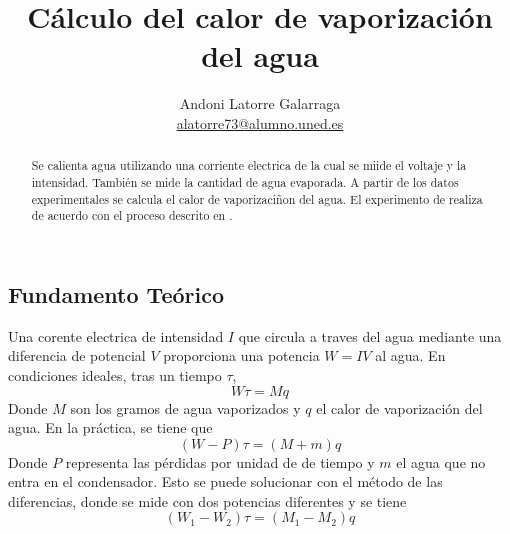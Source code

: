 \documentclass{article}
\title{Cálculo del calor de vaporización del agua}
\author{Andoni Latorre Galarraga \\ \href{mailto:alatorre73@alumno.uned.es}{alatorre73@alumno.uned.es}}
\date{}
\begin{document}
\maketitle
\begin{abstract}
Se calienta agua utilizando una corriente electrica de la cual se miide el voltaje y la intensidad. También se mide la cantidad de agua evaporada. A partir de los datos experimentales se calcula el calor de vaporizaciñon del agua. El experimento de realiza de acuerdo con el proceso descrito en \cite{web}.
\end{abstract}

\begin{multicols}{2}

\section*{Fundamento Teórico}
Una corente electrica de intensidad $I$ que circula a traves del agua mediante una diferencia de potencial $V$ proporciona una potencia $W = IV$ al agua. En condiciones ideales, tras un tiempo $\tau$,
$$
W\tau = Mq
$$
Donde $M$ son los gramos de agua vaporizados y $q$ el calor de vaporización del agua. En la práctica, se tiene que
$$
(W-P)\tau = (M+m)q
$$
Donde $P$ representa las pérdidas por unidad de de tiempo y $m$ el agua que no entra en el condensador. Esto se puede solucionar con el método de las diferencias, donde se mide con dos potencias diferentes y se tiene
$$
(W_1-W_2)\tau = (M_1-M_2)q
$$


\end{multicols}
\end{document}

